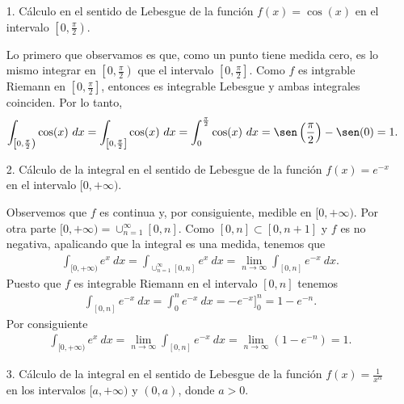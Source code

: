 \begin{ejemplo}
    \begin{enumerate}
        \item[1.] Cálculo en el sentido de Lebesgue de la función $f(x) = \cos(x)$ en el intervalo $\left[0,\frac{\pi}{2}\right)$.

              Lo primero que observamos es que, como un punto tiene medida cero, es lo mismo integrar en $\left[0,\frac{\pi}{2}\right)$ que el intervalo $\left[0,\frac{\pi}{2}\right]$. Como $f$ es intgrable Riemann en $\left[0,\frac{\pi}{2}\right]$, entonces es integrable Lebesgue y ambas integrales coinciden. Por lo tanto,
              \begin{align*}
                  \int_{\left[0,\frac{\pi}{2}\right)}{\cos(x) \ dx} = \int_{\left[0,\frac{\pi}{2}\right]}{\cos(x) \ dx} = \int_{0}^{\frac{\pi}{2}}{\cos(x) \ dx} = \sen\left(\frac{\pi}{2}\right) - \sen(0) = 1.
              \end{align*}
        \item[2.] Cálculo de la integral en el sentido de Lebesgue de la función $f(x) = e^{-x}$ en el intervalo $[0,+\infty)$.

              Observemos que $f$ es continua y, por consiguiente, medible en $[0,+\infty)$. Por otra parte $[0,+\infty) = \cup_{n=1}^{\infty}{[0,n]}$. Como $[0,n] \subset [0,n+1]$ y $f$ es no negativa, apalicando que la integral es una medida, tenemos que
              \begin{align*}
                  \int_{[0,+\infty)}{e^{x} \ dx} = \int_{\cup_{n=1}^{\infty}{[0,n]}}{e^{x} \ dx} = \lim_{n \to \infty}{\int_{[0,n]}{e^{-x} \ dx}}.
              \end{align*}
              Puesto que $f$ es integrable Riemann en el intervalo $[0,n]$ tenemos
              \begin{align*}
                  {\int_{[0,n]}{e^{-x} \ dx}} = \int_{0}^{n}{e^{-x} \ dx} = -e^{-x}]_0^n = 1 - e^{-n}.
              \end{align*}
              Por consiguiente
              \begin{align*}
                  \int_{[0,+\infty)}{e^{x} \ dx} = \lim_{n \to \infty}{\int_{[0,n]}{e^{-x} \ dx}} = \lim_{n \to \infty}{(1 - e^{-n})} = 1.
              \end{align*}
        \item[3.] Cálculo de la integral en el sentido de Lebesgue de la función $f(x) = \frac{1}{x^{\alpha}}$ en los intervalos $[a,+\infty)$ y $(0,a)$, donde $a > 0$.


\end{enumerate}
\end{ejemplo}

